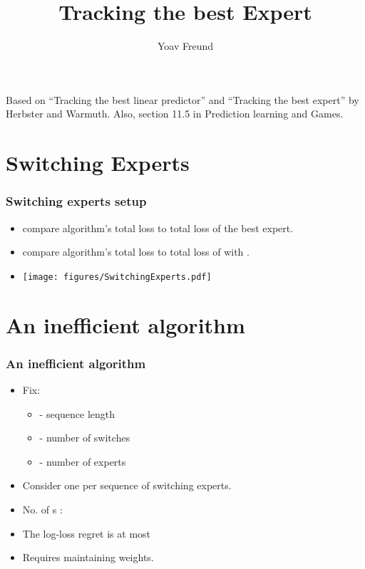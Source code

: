 \documentclass[handout]{beamer}
\title %
{Tracking the best Expert}
\author[Freund] %
{Yoav Freund}
\institute[Universities of Somewhere and Elsewhere] %
\begin{document}
%


\begin{frame}
  \titlepage
  Based on ``Tracking the best linear predictor'' and ``Tracking the
  best expert'' by Herbster and Warmuth. Also, section 11.5 in
  Prediction learning and Games.
\end{frame}


\begin{small}




\section{Switching Experts}

\begin{frame}
\frametitle{Switching experts setup}
\begin{itemize}
\item {} compare algorithm's total loss to total
  loss of the best expert.
\item {} compare algorithm's total loss to total
  loss of  with  .
\item
\texttt{[image: figures/SwitchingExperts.pdf]}
\end{itemize}
\end{frame}

\section{An inefficient algorithm}

\begin{frame}
\frametitle{An inefficient algorithm}
\begin{itemize}
\item Fix:
\begin{itemize}
\item {} - sequence length
\item {} - number of switches
\item {} - number of experts
\end{itemize}
\item Consider one  per sequence of switching experts.
\item No. of s : 
\item The log-loss regret is at most 
\item Requires maintaining  weights.
\end{itemize}
\end{frame}


\end{small}
\end{document}

